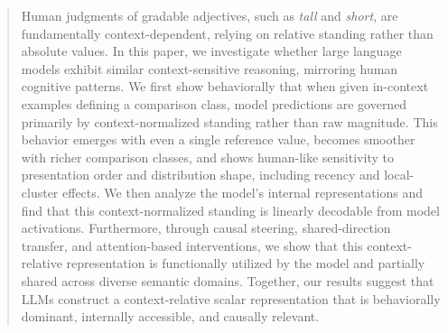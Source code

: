\documentclass{article}
\begin{document}

\printAffiliationsAndNotice{}



\begin{abstract}
Human judgments of gradable adjectives, such as \emph{tall} and \emph{short}, are fundamentally context-dependent, relying on relative standing rather than absolute values. In this paper, we investigate whether large language models exhibit similar context-sensitive reasoning, mirroring human cognitive patterns. We first show behaviorally that when given in-context examples defining a comparison class, model predictions are governed primarily by context-normalized standing rather than raw magnitude. This behavior emerges with even a single reference value, becomes smoother
with richer comparison classes, and shows human-like sensitivity to presentation order and distribution shape, including recency and local-cluster effects. We then analyze the model's internal representations and find that this context-normalized standing is linearly decodable from model activations. Furthermore, through causal steering, shared-direction transfer, and attention-based interventions, we show that this context-relative representation is functionally utilized by the model and partially shared across diverse semantic domains. Together, our results suggest that LLMs construct a context-relative scalar representation that is behaviorally dominant, internally accessible, and causally relevant.
\end{abstract}
\end{document}
